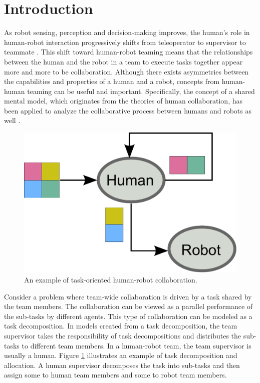 \section{Introduction}
\label{sec:intro}

As robot sensing, perception and decision-making improves, the human's role in human-robot interaction progressively shifts from teleoperator to supervisor to teammate \cite{SchusterJentsch2013}.
This shift toward human-robot teaming means that the relationships between the human and the robot in a team to execute tasks together appear more and more to be collaboration.
Although there exists asymmetries between the capabilities and properties of a human and a robot, concepts from human-human teaming can be useful and important.
Specifically, the concept of a shared mental model, which originates from the theories of human collaboration, has been applied to analyze the collaborative process between humans and robots as well \cite{LebiereJentschOsosky2013}.

\begin{figure}[bph]
\centering
\includegraphics[width=0.35\linewidth]{./images/hrt}
\caption{An example of task-oriented human-robot collaboration.}
\label{fig:hrt}
\end{figure}

Consider a problem where team-wide collaboration is driven by a task shared by the team members.
The collaboration can be viewed as a parallel performance of the sub-tasks by different agents.
This type of collaboration can be modeled as a task decomposition.
In models created from a task decomposition, the team supervisor takes the responsibility of task decompositions and distributes the sub-tasks to different team members.
In a human-robot team, the team supervisor is usually a human.
Figure \ref{fig:hrt} illustrates an example of task decomposition and allocation. 
A human supervisor decomposes the task into sub-tasks and then assign some to human team members and some to robot team members.

